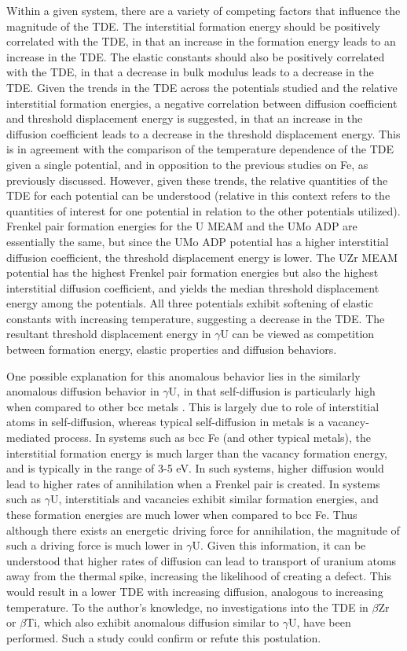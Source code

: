 \documentclass[review]{elsarticle}
\begin{document}
Within a given system, there are a variety of competing factors that influence the magnitude of the TDE. The interstitial formation energy should be positively correlated with the TDE, in that an increase in the formation energy leads to an increase in the TDE. The elastic constants should also be positively correlated with the TDE, in that a decrease in bulk modulus leads to a decrease in the TDE. Given the trends in the TDE across the potentials studied and the relative interstitial formation energies, a negative correlation between diffusion coefficient and threshold displacement energy is suggested, in that an increase in the diffusion coefficient leads to a decrease in the threshold displacement energy. This is in agreement with the comparison of the temperature dependence of the TDE given a single potential, and in opposition to the previous studies on Fe, as previously discussed. However, given these trends, the relative quantities of the TDE for each potential can be understood (relative in this context refers to the quantities of interest for one potential in relation to the other potentials utilized). Frenkel pair formation energies for the U MEAM and the UMo ADP are essentially the same, but since the UMo ADP potential has a higher interstitial diffusion coefficient, the threshold displacement energy is lower. The UZr MEAM potential has the highest Frenkel pair formation energies but also the highest interstitial diffusion coefficient, and yields the median threshold displacement energy among the potentials. All three potentials exhibit softening of elastic constants with increasing temperature, suggesting a decrease in the TDE. The resultant threshold displacement energy in $\gamma$U can be viewed as competition between formation energy, elastic properties and diffusion behaviors. 

One possible explanation for this anomalous behavior lies in the similarly anomalous diffusion behavior in $\gamma$U, in that self-diffusion is particularly high when compared to other bcc metals \cite{fedorov1978, smirnov1992}. This is largely due to role of interstitial atoms in self-diffusion, whereas typical self-diffusion in metals is a vacancy-mediated process. In systems such as bcc Fe (and other typical metals), the interstitial formation energy is much larger than the vacancy formation energy, and is typically in the range of 3-5 eV. In such systems, higher diffusion would lead to higher rates of annihilation when a Frenkel pair is created. In systems such as $\gamma$U, interstitials and vacancies exhibit similar formation energies, and these formation energies are much lower when compared to bcc Fe. Thus although there exists an energetic driving force for annihilation, the magnitude of such a driving force is much lower in $\gamma$U. Given this information, it can be understood that higher rates of diffusion can lead to transport of uranium atoms away from the thermal spike, increasing the likelihood of creating a defect. This would result in a lower TDE with increasing diffusion, analogous to increasing temperature. To the author's knowledge, no investigations into the TDE in $\beta$Zr or $\beta$Ti, which also exhibit anomalous diffusion similar to $\gamma$U, have been performed. Such a study could confirm or refute this postulation. 
\end{document}
